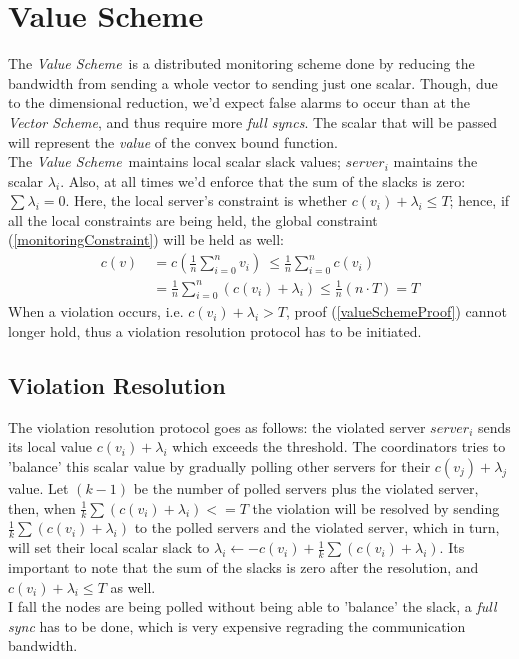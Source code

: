 \documentclass[10pt, conference]{IEEEtran}
\newcommand{\vectorScheme}{\textit{Vector Scheme}}
\newcommand{\valueScheme}{\textit{Value Scheme}}
\begin{document}
\section{Value Scheme}
The \valueScheme \ is a distributed monitoring scheme done by reducing the bandwidth from sending a whole vector to sending just one scalar.  Though, due to the dimensional reduction, we'd expect false alarms to occur than at the \vectorScheme , and thus require more \textit{full syncs}. The scalar that will be passed will represent the \textit{value} of the convex bound function.\\
The \valueScheme \  maintains local scalar slack values; $server_i$ maintains the scalar $\lambda _i$. Also, at all times we'd enforce that the sum of the slacks is zero: $\sum{\lambda _i} = 0$. Here, the local server's constraint is whether $c(v_i) + \lambda _i \leq T$; hence, if all the local constraints are being held, the global constraint (\ref{monitoringConstraint}) will be held as well:
\begin{equation}
\label{valueSchemeProof}
\begin{aligned}
 c(v)  \
	    &=   c\left(\frac{1}{n} \sum\limits_{i=0}^{n}{v_i}\right)  \
       \leq   \frac{1}{n} \sum\limits_{i=0}^{n}c(v_i) \\
        &=    \frac{1}{n} \sum\limits_{i=0}^{n}{(c(v_i) + \lambda _i)}
       \leq   \frac{1}{n}(n \cdot T)
        = T
\end{aligned}
\end{equation}
When a violation occurs, i.e. $c(v_i) + \lambda _i > T$, proof (\ref{valueSchemeProof}) cannot longer hold, thus a violation resolution protocol has to be initiated.
\subsection{Violation Resolution}
The violation resolution protocol goes as follows: the violated server $server_i$ sends its local value $c(v_i) + \lambda _i$ which exceeds the threshold. The coordinators tries to 'balance' this scalar value by gradually polling other servers for their $c(v_j) + \lambda _j$ value. Let $(k-1)$ be the number of polled servers plus the violated server, then, when $\frac{1}{k}\sum{(c(v_i) + \lambda _i)} <= T$ the violation will be resolved by sending $\frac{1}{k}\sum{(c(v_i) + \lambda _i )}$ to the polled servers and the violated server, which in turn, will set their local scalar slack to $\lambda _i \leftarrow -c(v_i) + \frac{1}{k}\sum{(c(v_i) + \lambda _i)}$. Its important to note that the sum of the slacks is zero after the resolution, and $c(v_i) + \lambda _i \leq T$ as well. \\
I fall the nodes are being polled without being able to 'balance' the slack, a \textit{full sync} has to be done, which is very expensive regrading the communication bandwidth.
\end{document}

